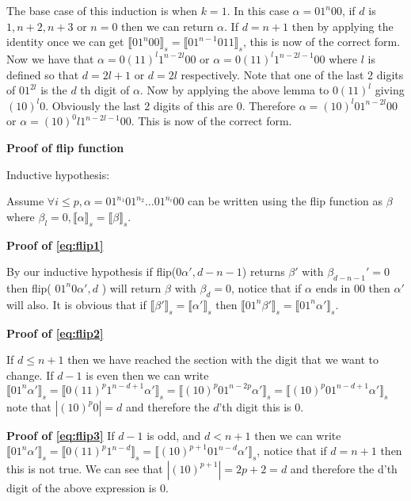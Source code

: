 \documentclass{cs4rep}
\begin{document}
The base case of this induction is when $k = 1$. In this case $\alpha
= 01^{n}00$, if $d$ is $1, n+2,n+3$ or $n=0$ then we can return
$\alpha$. If $d=n+1$ then by applying the identity once we can get $
\llbracket 01^{n}00 \rrbracket_{s} = \llbracket 01^{n-1}011
\rrbracket_{s} $, this is now of the correct form. Now we have that
$\alpha = 0(11)^{l}1^{n-2l}00$ or $\alpha = 0(11)^{l}1^{n-2l-1}00$
where $l$ is defined so that $d=2l+1$ or $d=2l$ respectively. Note
that one of the last 2 digits of $01^{2l}$ is the $d$ th digit of
$\alpha$. Now by applying the above lemma to $0(11)^{l}$ giving
$(10)^{l}0$. Obviously the last 2 digits of this are 0. Therefore
$\alpha = (10)^{l}01^{n-2l}00$ or $\alpha = (10)^0{l}1^{n-2l-1}00$.
This is now of the correct form.

{\bf Proof of flip function}

Inductive hypothesis:

Assume $ \forall i \leq p, \alpha = 01^{n_{1}}01^{n_{2}} \ldots
01^{n_{i}}00$ can be written using the flip function as $ \beta $
where $ \beta_{l}=0, \llbracket \alpha \rrbracket_{s} = \llbracket
\beta \rrbracket_{s} $.

{\bf Proof of \ref{eq:flip1} }

By our inductive hypothesis if
flip($0\alpha',d-n-1$) returns $\beta'$ with $\beta_{d-n-1}'=0$ then
flip( $01^{n}0\alpha', d $ ) will return $\beta$ with $\beta_{d}=0$,
notice that if $\alpha$ ends in 00 then $\alpha'$ will also. It is
obvious that if $ \llbracket \beta' \rrbracket_{s} = \llbracket
\alpha' \rrbracket_{s} $ then $ \llbracket 01^{n} \beta'
\rrbracket_{s} = \llbracket 01^{n} \alpha' \rrbracket_{s} $.


{\bf Proof of \ref{eq:flip2} }

If $d \leq n+1$ then we have reached
the section with the digit that we want to change. If $d-1$ is even
then we can write $ \llbracket 01^{n}\alpha' \rrbracket_{s} =
\llbracket 0(11)^{p}1^{n-d+1} \alpha' \rrbracket_{s} = \llbracket
(10)^{p}01^{n-2p}\alpha' \rrbracket_{s} = \llbracket
(10)^{p}01^{n-d+1} \alpha' \rrbracket_{s} $ note that $|(10)^p0|=d$
and therefore the $d$'th digit this is 0.


{\bf Proof of \ref{eq:flip3} } 
If $d-1$ is odd, and $d<n+1$ then we
can write $ \llbracket 01^{n}\alpha' \rrbracket_{s} = \llbracket
0(11)^{p}1^{n-d} \rrbracket_{s} = \llbracket (10)^{p+1}01^{n-d}\alpha'
\rrbracket_{s} $, notice that if $d=n+1$ then this is not true. We can
see that $|(10)^{p+1}| = 2p+2 = d$ and therefore the d'th digit of the
above expression is 0.
\end{document}
